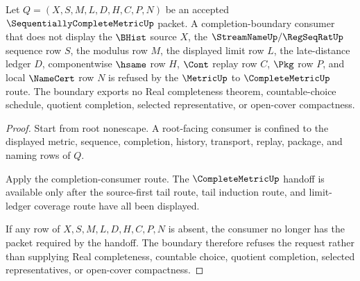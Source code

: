 \begin{theorem}
\label{thm:sequentially-complete-metric-completion-boundary-refusal}
Let $Q=(X,S,M,L,D,H,C,P,N)$ be an accepted $\SequentiallyCompleteMetricUp$ packet. A completion-boundary consumer that does not display the $\BHist$ source $X$, the $\StreamNameUp/\RegSeqRatUp$ sequence row $S$, the modulus row $M$, the displayed limit row $L$, the late-distance ledger $D$, componentwise $\hsame$ row $H$, $\Cont$ replay row $C$, $\Pkg$ row $P$, and local $\NameCert$ row $N$ is refused by the $\MetricUp$ to $\CompleteMetricUp$ route. The boundary exports no Real completeness theorem, countable-choice schedule, quotient completion, selected representative, or open-cover compactness.
\end{theorem}
\begin{proof}
Start from root nonescape. A root-facing consumer is confined to the displayed metric, sequence, completion, history, transport, replay, package, and naming rows of $Q$.

Apply the completion-consumer route. The $\CompleteMetricUp$ handoff is available only after the source-first tail route, tail induction route, and limit-ledger coverage route have all been displayed.

If any row of $X,S,M,L,D,H,C,P,N$ is absent, the consumer no longer has the packet required by the handoff. The boundary therefore refuses the request rather than supplying Real completeness, countable choice, quotient completion, selected representatives, or open-cover compactness.
\end{proof}

